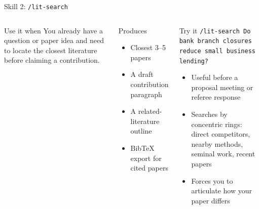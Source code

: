 \documentclass[aspectratio=169,professionalfonts]{beamer}
\begin{document}
\begin{frame}[t]{Skill 2: \texttt{/lit-search}}
\small
\begin{columns}[T,onlytextwidth]
\begin{block}{Use it when}
You already have a question or paper idea and need to locate the closest literature before claiming a contribution.
\end{block}
\begin{block}{Produces}
\begin{itemize}
  \item Closest 3--5 papers
  \item A draft contribution paragraph
  \item A related-literature outline
  \item BibTeX export for cited papers
\end{itemize}
\end{block}
\begin{exampleblock}{Try it}
{\small\texttt{/lit-search Do bank branch closures reduce small business lending?}}
\medskip
\begin{itemize}
  \item Useful before a proposal meeting or referee response
  \item Searches by concentric rings: direct competitors, nearby methods, seminal work, recent papers
  \item Forces you to articulate how your paper differs
\end{itemize}
\end{exampleblock}
\end{columns}
\end{frame}
\end{document}
